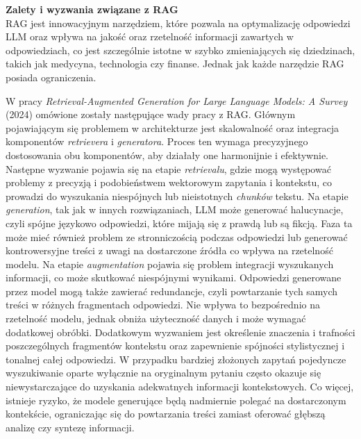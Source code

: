 \documentclass[
a4paper,
12pt,
]{article}
\newcounter{subsubsubsection}[subsubsection]
\begin{document}
\noindent\textbf{Zalety i wyzwania związane z RAG}\\

RAG jest innowacyjnym narzędziem, które pozwala na optymalizację odpowiedzi LLM oraz wpływa na jakość oraz rzetelność informacji zawartych w odpowiedziach, co jest szczególnie istotne w szybko zmieniających się dziedzinach, takich jak medycyna, technologia czy finanse. Jednak jak każde narzędzie RAG posiada ograniczenia.

W pracy \textit{Retrieval-Augmented Generation for Large Language Models: A Survey} (2024) \cite{rag:survey} omówione zostały następujące wady pracy z RAG. Głównym pojawiającym się problemem w architekturze jest skalowalność oraz integracja komponentów \textit{retrievera} i \textit{generatora}. Proces ten wymaga precyzyjnego dostosowania obu komponentów, aby działały one harmonijnie i efektywnie.
% 
Następne wyzwanie pojawia się na etapie \textit{retrievalu}, gdzie mogą występować problemy z precyzją i podobieństwem wektorowym zapytania i kontekstu, co prowadzi do wyszukania niespójnych lub nieistotnych \textit{chunków} tekstu. 
% 
Na etapie \textit{generation}, tak jak w innych rozwiązaniach, LLM może generować halucynacje, czyli spójne językowo odpowiedzi, które mijają się z prawdą lub są fikcją. Faza ta może mieć również problem ze stronniczością podczas odpowiedzi lub generować kontrowersyjne treści z uwagi na dostarczone źródła co wpływa na rzetelność modelu. 
% 
Na etapie \textit{augmentation} pojawia się problem integracji wyszukanych informacji, co może skutkować niespójnymi wynikami. Odpowiedzi generowane przez model mogą także zawierać redundancje, czyli powtarzanie tych samych treści w różnych fragmentach odpowiedzi. Nie wpływa to bezpośrednio na rzetelność modelu, jednak obniża użyteczność danych i może wymagać dodatkowej obróbki.
% 
Dodatkowym wyzwaniem jest określenie znaczenia i trafności poszczególnych fragmentów kontekstu oraz zapewnienie spójności stylistycznej i tonalnej całej odpowiedzi. W przypadku bardziej złożonych zapytań pojedyncze wyszukiwanie oparte wyłącznie na oryginalnym pytaniu często okazuje się niewystarczające do uzyskania adekwatnych informacji kontekstowych.
% 
Co więcej, istnieje ryzyko, że modele generujące będą nadmiernie polegać na dostarczonym kontekście, ograniczając się do powtarzania treści zamiast oferować głębszą analizę czy syntezę informacji.

\end{document}
